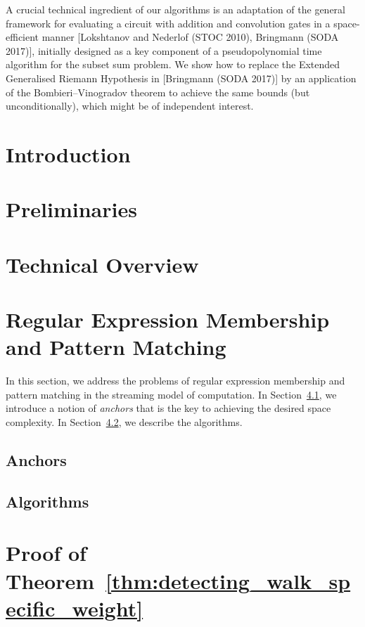 \begin{small}
A crucial technical ingredient of our algorithms is an adaptation of the general framework for evaluating a circuit with addition
and convolution gates in a space-efficient manner [Lokshtanov and Nederlof (STOC 2010), Bringmann (SODA 2017)],
initially designed as a key component of a pseudopolynomial time algorithm for the subset sum problem. We show
how to replace the Extended Generalised Riemann Hypothesis in [Bringmann (SODA 2017)] by an application
of the Bombieri--Vinogradov theorem to achieve the same bounds (but unconditionally), which might be of independent
interest.
\end{small}

\section{Introduction}
\label{sec:introduction}


\section{Preliminaries}
\label{sec:prelim}


\section{Technical Overview}
\label{sec:overview}


\section{Regular Expression Membership and Pattern Matching}\label{sec:regexp}
In this section, we address the problems of regular expression membership and pattern matching in the streaming model of computation. In Section~\ref{sec:anchors}, we introduce a notion of \emph{anchors} that is the key to achieving the desired space complexity. In Section~\ref{sec:algorithms}, we describe the algorithms.

\subsection{Anchors}
\label{sec:anchors}
%

\subsection{Algorithms}
\label{sec:algorithms}


\section{Proof of Theorem~\ref{thm:detecting_walk_specific_weight}}
\label{sec:paths-in-graph}



\printbibliography[heading=subbibintoc]